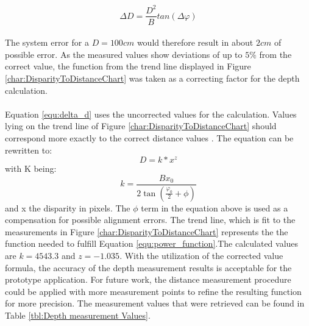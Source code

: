 \begin{equation}
\label{equ:delta_d}
\Delta D=\frac{D^{2}}{B} tan(\Delta\varphi)
\end{equation}
\\The system error for a $D=100cm$ would therefore result in about $2cm$ of possible error.
As the measured values show deviations of up to $5\%$ from the correct value, the function from the trend line displayed in Figure \ref{char:DisparityToDistanceChart} was taken as a correcting factor for the depth calculation.
\\\\Equation \ref{equ:delta_d} uses the uncorrected values for the calculation. Values lying on the trend line of Figure \ref{char:DisparityToDistanceChart} should correspond more exactly to the correct distance values \cite{ManafA.Mahammed.2013}. The equation can be rewritten to:
\begin{equation}
\label{equ:power_function}
D=k*x^{z}
\end{equation}
with K being:
\begin{equation}
k=\frac{Bx_0}{2\tan(\frac{\varphi_0}{2}+\phi)}
\end{equation}
and x the disparity in pixels.
The $\phi$ term in the equation above is used as a compensation for possible alignment errors.
The trend line, which is fit to the measurements in Figure \ref{char:DisparityToDistanceChart} represents the the function needed to fulfill Equation \ref{equ:power_function}.The calculated values are $k=4543.3$ and $z=-1.035$.
With the utilization of the corrected value formula, the accuracy of the depth measurement results is acceptable for the prototype application. For future work, the distance measurement procedure could be applied with more measurement points to refine the resulting function for more precision. The measurement values that were retrieved can be found in Table \ref{tbl:Depth measurement Values}.
\newpage
